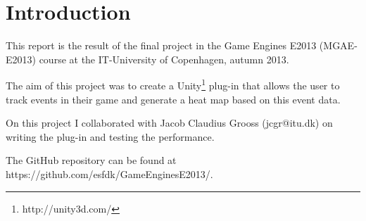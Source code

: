 \section{Introduction}
\label{Intro}
This report is the result of the final project in the Game Engines E2013 (MGAE-E2013) course at the IT-University of Copenhagen, autumn 2013. 

The aim of this project was to create a Unity\footnote{http://unity3d.com/} plug-in that allows the user to track events in their game and generate a heat map based on this event data.

On this project I collaborated with Jacob Claudius Grooss (jcgr@itu.dk) on writing the plug-in and testing the performance.

The GitHub repository can be found at https://github.com/esfdk/GameEnginesE2013/.
